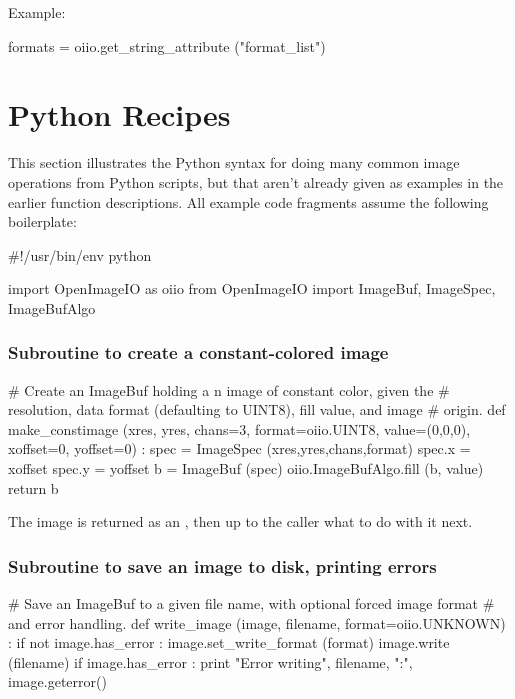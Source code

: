 \noindent Example:
\begin{code}
    formats = oiio.get_string_attribute ("format_list")
\end{code}
\apiend



\section{Python Recipes}
\label{sec:pythonrecipes}

This section illustrates the Python syntax for doing many common image
operations from Python scripts, but that aren't already given as examples
in the earlier function descriptions.  All example code fragments assume the
following boilerplate:

\begin{code}
    #!/usr/bin/env python 
    
    import OpenImageIO as oiio
    from OpenImageIO import ImageBuf, ImageSpec, ImageBufAlgo
\end{code}


\subsubsection*{Subroutine to create a constant-colored image}
\begin{code}
    # Create an ImageBuf holding a n image of constant color, given the
    # resolution, data format (defaulting to UINT8), fill value, and image
    # origin.
    def make_constimage (xres, yres, chans=3, format=oiio.UINT8, value=(0,0,0),
                         xoffset=0, yoffset=0) :
        spec = ImageSpec (xres,yres,chans,format)
        spec.x = xoffset
        spec.y = yoffset
        b = ImageBuf (spec)
        oiio.ImageBufAlgo.fill (b, value)
        return b
\end{code}

\noindent The image is returned as an \ImageBuf, then up to the caller 
what to do with it next.

\subsubsection*{Subroutine to save an image to disk, printing errors}
\begin{code}
    # Save an ImageBuf to a given file name, with optional forced image format
    # and error handling.
    def write_image (image, filename, format=oiio.UNKNOWN) :
        if not image.has_error :
            image.set_write_format (format)
            image.write (filename)
        if image.has_error :
            print "Error writing", filename, ":", image.geterror()
\end{code}


